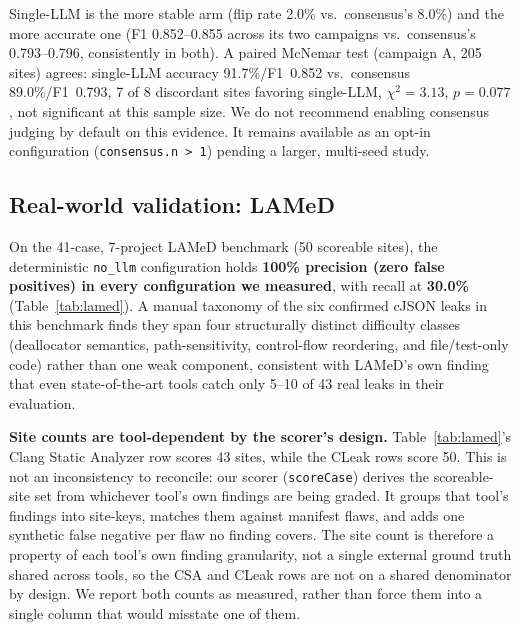 \documentclass[11pt,a4paper]{article}
\begin{document}
Single-LLM is the more stable arm (flip rate 2.0\% vs.\ consensus's 8.0\%)
and the more accurate one (F1 0.852--0.855 across its two campaigns vs.\
consensus's 0.793--0.796, consistently in both). A paired McNemar test
(campaign A, 205 sites) agrees: single-LLM accuracy 91.7\%/F1~0.852 vs.\
consensus 89.0\%/F1~0.793, 7 of 8 discordant sites favoring single-LLM,
$\chi^2 = 3.13$, $p = 0.077$, not significant at this sample size. We do
not recommend enabling consensus judging by default on this evidence. It
remains available as an opt-in configuration (\texttt{consensus.n~>~1})
pending a larger, multi-seed study.

\subsection{Real-world validation: LAMeD}
\label{sec:eval-lamed}

On the 41-case, 7-project LAMeD benchmark (50 scoreable sites), the
deterministic \texttt{no\_llm} configuration holds \textbf{100\% precision
(zero false positives) in every configuration we measured}, with recall at
\textbf{30.0\%} (Table~\ref{tab:lamed}). A manual taxonomy of the six
confirmed cJSON leaks in this benchmark finds they span four structurally
distinct difficulty classes (deallocator semantics, path-sensitivity,
control-flow reordering, and file/test-only code) rather than one weak
component, consistent with LAMeD's own finding that even state-of-the-art
tools catch only 5--10 of 43 real leaks in their evaluation.

\textbf{Site counts are tool-dependent by the scorer's design.} Table~\ref{tab:lamed}'s
Clang Static Analyzer row scores 43 sites, while the CLeak rows score 50. This is
not an inconsistency to reconcile: our scorer (\texttt{scoreCase}) derives
the scoreable-site set from whichever tool's own findings are being graded.
It groups that tool's findings into site-keys, matches them against
manifest flaws, and adds one synthetic false negative per flaw no finding
covers. The site count is therefore a property of each tool's own finding
granularity, not a single external ground truth shared across tools, so the
CSA and CLeak rows are not on a shared denominator by design. We report both
counts as measured, rather than force them into a single column that would
misstate one of them.
\end{document}
